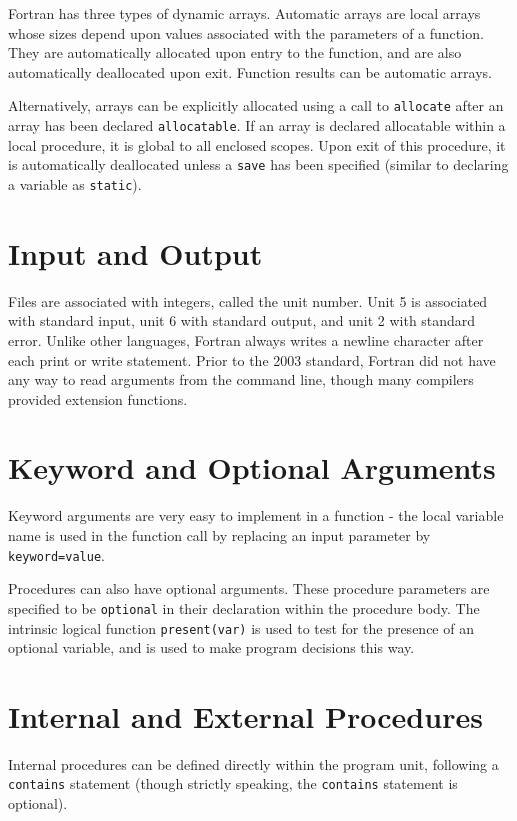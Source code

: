 \documentclass[10pt]{article}
\begin{document}
Fortran has three types of dynamic arrays. Automatic arrays are local arrays whose sizes depend upon values associated with the parameters of a function. They are automatically allocated upon entry to the function, and are also automatically deallocated upon exit. Function results can be automatic arrays. 

Alternatively, arrays can be explicitly allocated using a call to {\tt allocate} after an array has been declared {\tt allocatable}. If an array is declared allocatable within a local procedure, it is global to all enclosed scopes. Upon exit of this procedure, it is automatically deallocated unless a {\tt save} has been specified (similar to declaring a variable as {\tt static}).

\section{Input and Output}
Files are associated with integers, called the unit number. Unit 5 is associated with standard input, unit 6 with standard output, and unit 2 with standard error. Unlike other languages, Fortran always writes a newline character after each print or write statement.  Prior to the 2003 standard, Fortran did not have any way to read arguments from the command line, though many compilers provided extension functions. 

\section{Keyword and Optional Arguments}
Keyword arguments are very easy to implement in a function - the local variable name is used in the function call by replacing an input parameter by {\tt keyword=value}. 

Procedures can also have optional arguments. These procedure parameters are specified to be {\tt optional} in their declaration within the procedure body. The intrinsic logical function {\tt present(var)} is used to test for the presence of an optional variable, and is used to make program decisions this way.

\section{Internal and External Procedures}

Internal procedures can be defined directly within the program unit, following a {\tt contains} statement (though strictly speaking, the {\tt contains} statement is optional). 
\end{document}
